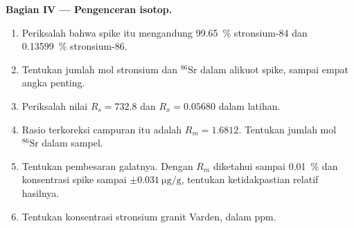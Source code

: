 \begin{problem}
\noindent\textbf{Bagian IV --- Pengenceran isotop.}
\begin{enumerate}[resume]
  \item Periksalah bahwa spike itu mengandung \qty{99.65}{\percent} stronsium-84 dan \qty{0.13599}{\percent}
        stronsium-86.
  \item Tentukan jumlah mol stronsium dan $^{86}\mathrm{Sr}$ dalam alikuot spike, sampai empat
        angka penting.
  \item Periksalah nilai $R_s = 732.8$ dan $R_x = 0.05680$ dalam latihan.
  \item Rasio terkoreksi campuran itu adalah $R_m = 1.6812$. Tentukan jumlah mol $^{86}\mathrm{Sr}$
        dalam sampel.
  \item Tentukan pembesaran galatnya. Dengan $R_m$ diketahui sampai \qty{0.01}{\percent} dan konsentrasi spike
        sampai $\pm\qty{0.031}{\micro\gram\per\gram}$, tentukan ketidakpastian relatif
        hasilnya.
  \item Tentukan konsentrasi stronsium granit Varden, dalam ppm.
\end{enumerate}
\end{problem}
